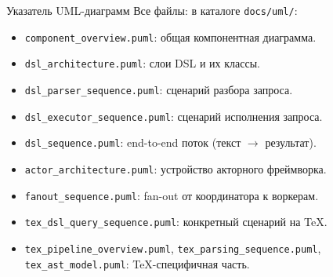 \documentclass[aspectratio=169,11pt]{beamer}
\begin{document}
\begin{frame}{Указатель UML-диаграмм}
  Все файлы: в каталоге \texttt{docs/uml/}:
  \begin{itemize}
    \item \texttt{component\_overview.puml}: общая компонентная диаграмма.
    \item \texttt{dsl\_architecture.puml}: слои DSL и их классы.
    \item \texttt{dsl\_parser\_sequence.puml}: сценарий разбора запроса.
    \item \texttt{dsl\_executor\_sequence.puml}: сценарий исполнения запроса.
    \item \texttt{dsl\_sequence.puml}: end-to-end поток (текст $\to$ результат).
    \item \texttt{actor\_architecture.puml}: устройство акторного фреймворка.
    \item \texttt{fanout\_sequence.puml}: fan-out от координатора к воркерам.
    \item \texttt{tex\_dsl\_query\_sequence.puml}: конкретный сценарий на TeX.
    \item \texttt{tex\_pipeline\_overview.puml},
          \texttt{tex\_parsing\_sequence.puml},
          \texttt{tex\_ast\_model.puml}: TeX-специфичная часть.
  \end{itemize}
\end{frame}
\end{document}
